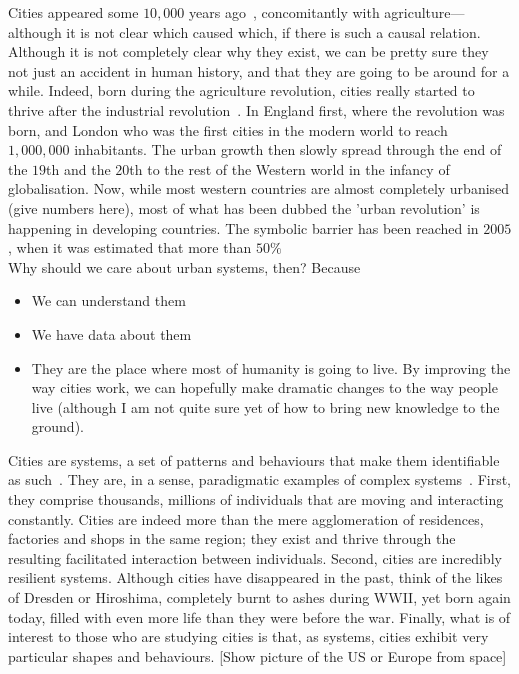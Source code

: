 Cities appeared some $10,000$ years ago~\cite{Bairoch, Mumford}, concomitantly
with agriculture---although it is not clear which caused which, if there is such
a causal relation. Although it is not completely clear why they exist, we can be
pretty sure they not just an accident in human history, and that they are going
to be around for a while. Indeed, born during the agriculture revolution,
cities really started to thrive after the industrial revolution~\cite{Bairoch}.
In England first, where the revolution was born, and London who was the first
cities in the modern world to reach $1,000,000$ inhabitants. The urban growth
then slowly spread through the end of the $19$th and the $20$th to the rest of
the Western world in the infancy of globalisation. Now, while most western
countries are almost completely urbanised (give numbers here), most of what has
been dubbed the 'urban 
revolution' is happening in developing countries. The symbolic barrier has been
reached in $2005$, when it was estimated that more than $50\%$ \\

Why should we care about urban systems, then? Because
\begin{itemize}
    \item We can understand them
    \item We have data about them
    \item They are the place where most of humanity is going to live. By
        improving the way cities work, we can hopefully make dramatic changes to
        the way people live (although I am not quite sure yet of how to bring
        new knowledge to the ground).
\end{itemize}

Cities are systems, a set of patterns and behaviours that make them identifiable
as such~\cite{Dennett:1991}. They are, in a sense, paradigmatic examples of
complex systems~\cite{Ladyman:2013}. First, they comprise thousands, millions
of individuals that are moving and interacting constantly. Cities are indeed
more than the mere agglomeration of residences, factories and shops in the same
region; they exist and thrive through the resulting facilitated interaction
between individuals. Second, cities are incredibly resilient systems. Although
cities have disappeared in the past, think of the likes of Dresden or Hiroshima,
completely burnt to ashes during WWII, yet born again today, filled with even
more life than they were before the war. Finally, what is of interest to those
who are studying cities is that, as systems, cities exhibit very particular
shapes and behaviours. [Show picture of the US or Europe from space]\\


